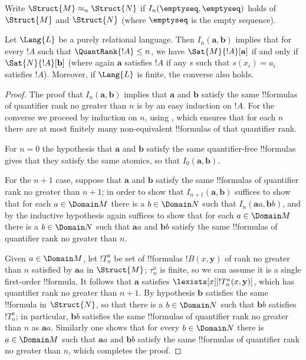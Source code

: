 \documentclass[../../include/open-logic-section]{subfiles}
\begin{document}
\begin{defn}
  Write $\Struct{M} \approx_n \Struct{N}$ if
  $I_n(\emptyseq,\emptyseq)$ holds of $\Struct{M}$ and
  $\Struct{N}$ (where $\emptyseq$ is the empty sequence).
\end{defn}

\begin{thm}
  Let $\Lang{L}$ be a purely relational language. Then $I_n
  (\mathbf{a},\mathbf{b})$ implies that for every $!A$ such that
  $\QuantRank{!A} \le n$, we have $\Sat{M}{!A}[\mathbf{a}]$ if and
  only if $\Sat{N}{!A}[\mathbf{b}]$ (where again $\mathbf{a}$
  satisfies $!A$ if any $s$ such that $s(x_i) = a_i$ satisfies
  $!A$). Moreover, if $\Lang{L}$ is finite, the converse also holds.
\end{thm}

\begin{proof}
  The proof that $I_n(\mathbf{a},\mathbf{b})$ implies that
  $\mathbf{a}$ and $\mathbf{b}$ satisfy the same !!{formula}s of
  quantifier rank no greater than $n$ is by an easy induction on
  $!A$. For the converse we proceed by induction on $n$, using
  , which ensures that for each $n$
  there are at most finitely many non-equivalent !!{formula}s of that
  quantifier rank.

  For $n=0$ the hypothesis that $\mathbf{a}$ and $\mathbf{b}$ satisfy
  the same quantifier-free !!{formula}s gives that they satisfy the same
  atomics, so that $I_0(\mathbf{a},\mathbf{b})$.

  For the $n+1$ case, suppose that $\mathbf{a}$ and $\mathbf{b}$
  satisfy the same !!{formula}s of quantifier rank no greater than
  $n+1$; in order to show that $I_{n+1}(\mathbf{a},\mathbf{b})$
  suffices to show that for each $a \in \Domain M$ there is a $b \in
  \Domain N$ such that $I_n(\mathbf{a}a,\mathbf{b}b)$, and by the
  inductive hypothesis again suffices to show that for each $a \in
  \Domain M$ there is a $b \in \Domain N$ such that $\mathbf{a}a$ and
  $\mathbf{b}b$ satisfy the same !!{formula}s of quantifier rank no
  greater than $n$.

  Given $a \in \Domain M$, let $!T^a_n$ be set of !!{formula}s
  $!B(x,\mathbf{y})$ of rank no greater than $n$ satisfied by
  $\mathbf{a}a$ in $\Struct{M}$; $\tau^a_n$ is finite, so we can
  assume it is a single first-order !!{formula}. It follows that
  $\mathbf{a}$ satisfies $\lexists[x][!T^a_n(x,\mathbf{y})]$, which
  has quantifier rank no greater than $n+1$. By hypothesis
  $\mathbf{b}$ satisfies the same !!{formula} in $\Struct{N}$, so that
  there is a $b \in \Domain N$ such that $\mathbf{b}b$ satisfies
  $!T^a_n$; in particular, $\mathbf{b}b$ satisfies the same
  !!{formula}s of quantifier rank no greater than $n$ as
  $\mathbf{a}a$. Similarly one shows that for every $b \in \Domain N$
  there is $a\in \Domain M$ such that $\mathbf{a}a$ and $\mathbf{b}b$
  satisfy the same !!{formula}s of quantifier rank no greater than $n$,
  which completes the proof.
\end{proof}
\end{document}
